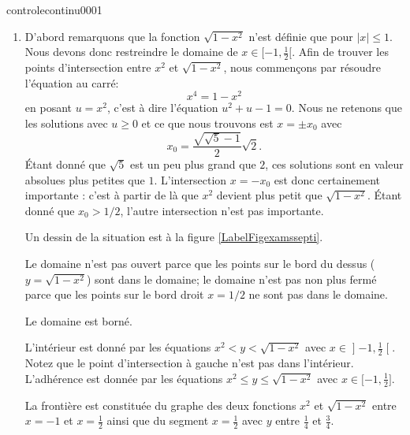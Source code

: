 \begin{corrige}{controlecontinu0001}


\begin{enumerate}
    \item
        D'abord remarquons que la fonction \( \sqrt{1-x^2}\) n'est définie que pour \( | x |\leq 1\). Nous devons donc restreindre le domaine de \( x\in\mathopen[ -1 , \frac{ 1 }{2} [\). Afin de trouver les points d'intersection entre \( x^2\) et \( \sqrt{1-x^2}\), nous commençons par résoudre l'équation au carré:
        \begin{equation}
            x^4=1-x^2
        \end{equation}
        en posant \( u=x^2\), c'est à dire l'équation \( u^2+u-1=0\). Nous ne retenons que les solutions avec \( u\geq 0\) et ce que nous trouvons est \( x=\pm x_0\) avec
        \begin{equation}
            x_0=\frac{ \sqrt{\sqrt{5}-1} }{ 2 }\sqrt{2}.
        \end{equation}
        Étant donné que \( \sqrt{5}\) est un peu plus grand que \( 2\), ces solutions sont en valeur absolues plus petites que \( 1\). L'intersection \( x=-x_0\) est donc certainement importante : c'est à partir de là que \( x^2\) devient plus petit que \( \sqrt{1-x^2}\). Étant donné que \( x_0>1/2\), l'autre intersection n'est pas importante.
    
        Un dessin de la situation est à la figure \ref{LabelFigexamssepti}.
        \newcommand{\CaptionFigexamssepti}{Pour l'exercice \ref{exocontrolecontinu0001}}
        

        Le domaine n'est pas ouvert parce que les points sur le bord du dessus (\( y=\sqrt{1-x^2}\)) sont dans le domaine; le domaine n'est pas non plus fermé parce que les points sur le bord droit \( x=1/2\) ne sont pas dans le domaine.

        Le domaine est borné.

        L'intérieur est donné par les équations \( x^2<y<\sqrt{1-x^2}\) avec \( x\in\mathopen] -1 , \frac{ 1 }{2} \mathclose[\). Notez que le point d'intersection à gauche n'est pas dans l'intérieur. L'adhérence est donnée par les équations \( x^2\leq y\leq\sqrt{1-x^2}\) avec \( x\in\mathopen[ -1 , \frac{ 1 }{2} \mathclose]\).

        La frontière est constituée du graphe des deux fonctions \( x^2\) et \( \sqrt{1-x^2}\) entre \( x=-1\) et \( x=\frac{ 1 }{2}\) ainsi que du segment \( x=\frac{ 1 }{2}\) avec \( y\) entre \( \frac{1}{ 4 }\) et \( \frac{ 3 }{ 4 }\).


\end{enumerate}
\end{corrige}
